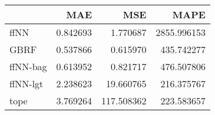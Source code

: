 \begin{tabular}{lrrr}
\toprule
{} &       MAE &         MSE &         MAPE \\
\midrule
ffNN     &  0.842693 &    1.770687 &  2855.996153 \\
GBRF     &  0.537866 &    0.615970 &   435.742277 \\
ffNN-bag &  0.613952 &    0.821717 &   476.507806 \\
ffNN-lgt &  2.238623 &   19.660765 &   216.375767 \\
tope     &  3.769264 &  117.508362 &   223.583657 \\
\bottomrule
\end{tabular}
